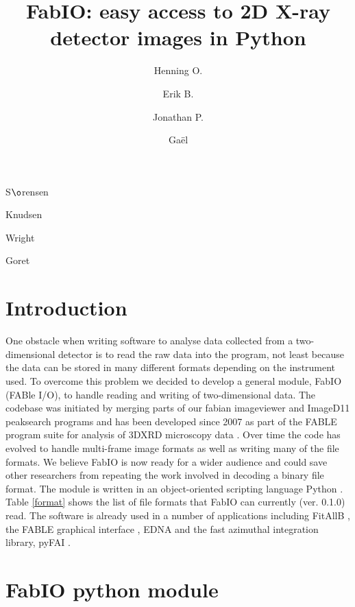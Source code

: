 \documentclass{iucr}
\begin{document}
\title{FabIO: easy access to 2D X-ray detector images in Python}

    \author[a]{Henning O.}{S$\o$rensen}
    \author[b]{Erik B.}{Knudsen}
    \author[c]{Jonathan P.}{Wright}
	\author[c]{Ga\"el}{Goret}

\maketitle

\section{Introduction}

One obstacle when writing software to analyse data collected from a
two-dimensional detector is to read the raw data into the program,
not least because the data can be stored in many different formats
depending on the instrument used.
To overcome this problem we decided to develop a general module,
FabIO (FABle I/O), to handle reading and writing of two-dimensional
data.
The codebase was initiated by merging parts of our fabian imageviewer
\cite{fabian} and ImageD11 \cite{ImageD11} peaksearch programs and has
been developed since 2007 as part of the FABLE \cite{fable} program suite
for analysis of 3DXRD microscopy data \cite{3dxrd}.
Over time the code has evolved to handle multi-frame image formats
as well as writing many of the file formats.
We believe FabIO is now ready for a wider audience and could save other
researchers from repeating the work involved in decoding a
binary file format.
The module is written in an object-oriented scripting language Python
\cite{python}.
Table \ref{format} shows the list of file formats that FabIO
can currently (ver. 0.1.0) read.
The software is already used in a number of applications including
FitAllB \cite{fitallb}, the FABLE graphical interface \cite{fable}, EDNA\cite{edna}
and the fast azimuthal integration library, pyFAI \cite{pyfai}.


\section{FabIO python module}
\end{document}
